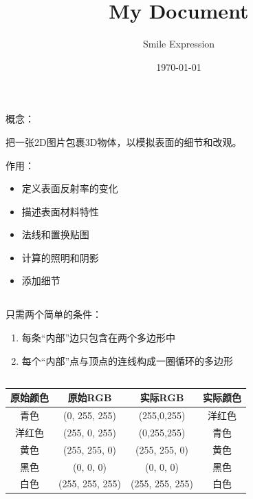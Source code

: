 \documentclass{article}
\begin{document}
\title{My Document}
\author{Smile Expression}
\date{\today}

\maketitle

\section{}

\subsection{}

概念：

把一张2D图片包裹3D物体，以模拟表面的细节和改观。

作用：

\begin{itemize}[leftmargin=2cm]
    \item 定义表面反射率的变化
    \item 描述表面材料特性
    \item 法线和置换贴图
    \item 计算的照明和阴影
    \item 添加细节
\end{itemize}

\subsection{}

只需两个简单的条件：

\begin{enumerate}[leftmargin=2cm]
    \item 每条“内部”边只包含在两个多边形中
    \item 每个“内部”点与顶点的连线构成一圈循环的多边形
\end{enumerate}

\subsection{}

\begin{tabular}{|c|c|c|c|}
    \hline
    原始颜色 & 原始RGB           & 实际RGB           & 实际颜色 \\
    \hline
    青色   & (0, 255, 255)   & (255,0,255)     & 洋红色  \\
    \hline
    洋红色  & (255, 0, 255)   & (0,255,255)     & 青色   \\
    \hline
    黄色   & (255, 255, 0)   & (255, 255, 0)   & 黄色   \\
    \hline
    黑色   & (0, 0, 0)       & (0, 0, 0)       & 黑色   \\
    \hline
    白色   & (255, 255, 255) & (255, 255, 255) & 白色   \\
    \hline
\end{tabular}
\end{document}
